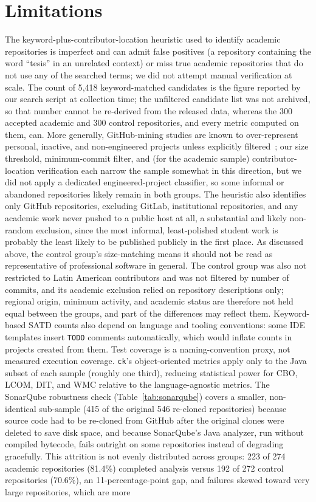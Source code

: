 \documentclass{cleiej}
\providecommand{\citep}[1]{\cite{#1}}
\begin{document}
\section{Limitations}

The keyword-plus-contributor-location heuristic used to identify academic repositories is imperfect and can admit false positives (a repository containing the word ``tesis'' in an unrelated context) or miss true academic repositories that do not use any of the searched terms; we did not attempt manual verification at scale. The count of 5{,}418 keyword-matched candidates is the figure reported by our search script at collection time; the unfiltered candidate list was not archived, so that number cannot be re-derived from the released data, whereas the 300 accepted academic and 300 control repositories, and every metric computed on them, can. More generally, GitHub-mining studies are known to over-represent personal, inactive, and non-engineered projects unless explicitly filtered~\citep{kalliamvakou2014promises,munaiah2017curating}; our size threshold, minimum-commit filter, and (for the academic sample) contributor-location verification each narrow the sample somewhat in this direction, but we did not apply a dedicated engineered-project classifier, so some informal or abandoned repositories likely remain in both groups. The heuristic also identifies only GitHub repositories, excluding GitLab, institutional repositories, and any academic work never pushed to a public host at all, a substantial and likely non-random exclusion, since the most informal, least-polished student work is probably the least likely to be published publicly in the first place. As discussed above, the control group's size-matching means it should not be read as representative of professional software in general. The control group was also not restricted to Latin American contributors and was not filtered by number of commits, and its academic exclusion relied on repository descriptions only; regional origin, minimum activity, and academic status are therefore not held equal between the groups, and part of the differences may reflect them. Keyword-based SATD counts also depend on language and tooling conventions: some IDE templates insert \texttt{TODO} comments automatically, which would inflate counts in projects created from them. Test coverage is a naming-convention proxy, not measured execution coverage. \texttt{ck}'s object-oriented metrics apply only to the Java subset of each sample (roughly one third), reducing statistical power for CBO, LCOM, DIT, and WMC relative to the language-agnostic metrics. The SonarQube robustness check (Table~\ref{tab:sonarqube}) covers a smaller, non-identical sub-sample (415 of the original 546 re-cloned repositories) because source code had to be re-cloned from GitHub after the original clones were deleted to save disk space, and because SonarQube's Java analyzer, run without compiled bytecode, fails outright on some repositories instead of degrading gracefully. This attrition is not evenly distributed across groups: 223 of 274 academic repositories (81.4\%) completed analysis versus 192 of 272 control repositories (70.6\%), an 11-percentage-point gap, and failures skewed toward very large repositories, which are more 
\end{document}
